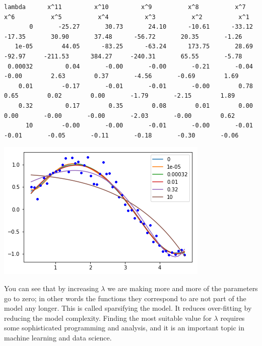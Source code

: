 \documentclass[11pt]{article}
\begin{document}
\begin{verbatim}
lambda      x^11         x^10         x^9          x^8          x^7          x^6          x^5          x^4          x^3          x^2          x^1
       0       -25.27       30.73       24.10      -10.61      -33.12      -17.35       30.90       37.48      -56.72       20.35       -1.26
   1e-05        44.05      -83.25      -63.24      173.75       28.69      -92.97     -211.53      384.27     -240.31       65.55       -5.78
 0.00032         0.04       -0.00       -0.00       -0.21       -0.04       -0.00        2.63        0.37       -4.56       -0.69        1.69
    0.01        -0.17       -0.01       -0.01       -0.00        0.78        0.65        0.02        0.00       -1.79       -2.15        1.89
    0.32         0.17        0.35        0.08        0.01        0.00        0.00       -0.00       -0.00       -2.03       -0.00        0.62
      10        -0.00       -0.00       -0.01       -0.00       -0.01       -0.01       -0.05       -0.11       -0.18       -0.30       -0.06

\end{verbatim}




\begin{center}
\includegraphics[width=.9\linewidth]{obipy-resources/d00b1703e45a1bb2f86b06f32bba01b8-19673r_k.png}
\end{center}

You can see that by increasing \(\lambda\) we are making more and more of the parameters go to zero; in other words the functions they correspond to are not part of the model any longer. This is called sparsifying the model. It reduces over-fitting by reducing the model complexity. Finding the most suitable value for \(\lambda\) requires some sophisticated programming and analysis, and it is an important topic in machine learning and data science.
\end{document}
